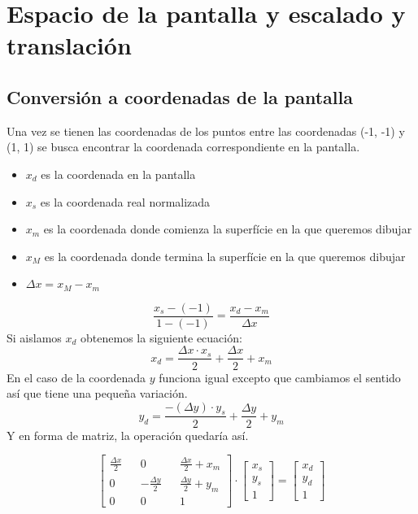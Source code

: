 \chapter{Espacio de la pantalla y escalado y translación}
\section{Conversión a coordenadas de la pantalla}
Una vez se tienen las coordenadas de los puntos entre las coordenadas (-1, -1) y (1, 1) se busca encontrar la coordenada correspondiente en la pantalla.
\begin{itemize}
  \item{\(x_d\) es la coordenada en la pantalla}
  \item{\(x_s\) es la coordenada real normalizada}  
  \item{\(x_m\) es la coordenada donde comienza la superfície en la que queremos dibujar}
  \item{\(x_M\) es la coordenada donde termina la superfície en la que queremos dibujar}  
  \item{\(\Delta x = x_M - x_m\)}
\end{itemize}
\begin{equation*}
  \frac{x_s-(-1)}{1-(-1)} = \frac{x_d - x_m}{\Delta x}
\end{equation*}
Si aislamos \(x_d\) obtenemos la siguiente ecuación:
\begin{equation*}
  x_d = \frac{\Delta x \cdot x_s}{2}+\frac{\Delta x}{2}+x_m
\end{equation*}
En el caso de la coordenada \(y\) funciona igual excepto que cambiamos el sentido así que tiene una pequeña variación.
\begin{equation*}
  y_d = \frac{-(\Delta y) \cdot y_s}{2}+\frac{\Delta y}{2}+y_m
\end{equation*}
Y en forma de matriz, la operación quedaría así.

\begin{equation*}
  \begin{bmatrix}
     \frac{\Delta x}{2} && 0 && \frac{\Delta x}{2} + x_m\\
     0 && - \frac{\Delta y}{2} && \frac{\Delta y}{2} + y_m \\
     0 && 0 && 1
  \end{bmatrix}
  \cdot
  \begin{bmatrix}
    x_s\\
    y_s\\
    1
  \end{bmatrix}
  =
  \begin{bmatrix}
    x_d\\
    y_d\\
    1
  \end{bmatrix}
\end{equation*}

